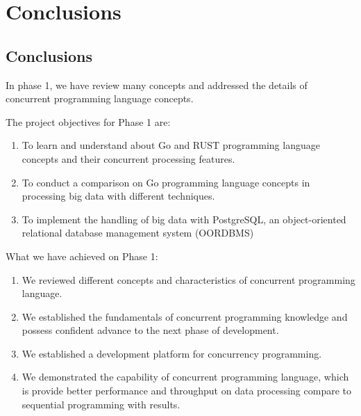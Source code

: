 \chapter{Conclusions} 

\label{Chapter8} 


\doublespacing


\section{Conclusions}

In phase 1, we have review many concepts and addressed the details of concurrent programming language concepts.

The project objectives for Phase 1 are:
\begin{enumerate}[topsep=0pt,itemsep=-1ex,partopsep=1ex,parsep=1.5ex]
	
	\item To learn and understand about Go and RUST programming language concepts and their concurrent processing features.  
	\item To conduct a comparison on Go programming language concepts in processing big data with different techniques. 
	\item To implement the handling of big data with PostgreSQL, an object-oriented relational database management system (OORDBMS)
	
\end{enumerate}

\pagebreak

What we have achieved on Phase 1:
\begin{enumerate}[topsep=0pt,itemsep=-1ex,partopsep=1ex,parsep=1.5ex]
	
	\item We reviewed different concepts and characteristics of concurrent programming language.
	\item We established the fundamentals of concurrent programming knowledge and possess confident advance to the next phase of development.
	\item We established a development platform for concurrency programming.
	\item We demonstrated the capability of concurrent programming language, which is provide better performance and throughput on data processing compare to sequential programming with results.
	
\end{enumerate}


